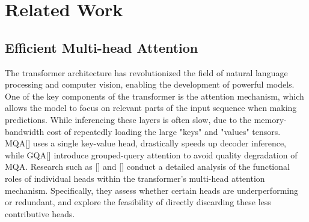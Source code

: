 \section{Related Work}
\subsection{Efficient Multi-head Attention}
The transformer architecture has revolutionized the field of natural language processing and computer vision, enabling the development of powerful models. One of the key components of the transformer is the attention mechanism, which allows the model to focus on relevant parts of the input sequence when making predictions. While inferencing these layers is often slow, due to the memory-bandwidth cost of repeatedly loading the large "keys" and "values" tensors. MQA[\cite{shazeer2019fast}] uses a single key-value head, drastically speeds up decoder inference, while GQA[\cite{ainslie2023gqa}] introduce grouped-query attention to avoid quality degradation of MQA. Research such as [\cite{voita2019analyzing}] and [\cite{michel2019sixteen}] conduct a detailed analysis of the functional roles of individual heads within the transformer's multi-head attention mechanism. Specifically, they assess whether certain heads are underperforming or redundant, and explore the feasibility of directly discarding these less contributive heads.

